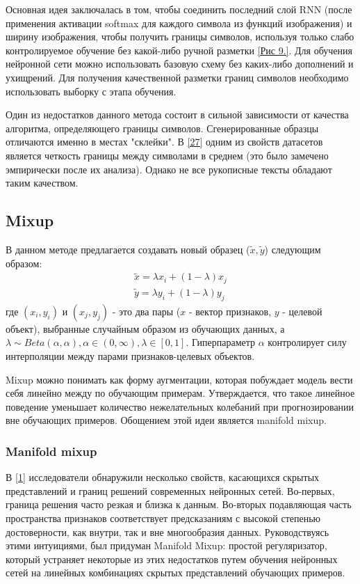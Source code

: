 Основная идея заключалась в том, чтобы соединить последний слой RNN (после применения активации softmax для каждого символа из функций изображения) и ширину изображения, чтобы получить границы символов, используя только слабо контролируемое обучение без какой-либо ручной разметки \hyperlink{image9}{[Рис 9.]}. Для обучения нейронной сети можно использовать базовую схему без каких-либо дополнений и ухищрений. Для получения качественной разметки границ символов необходимо использовать выборку с этапа обучения.

Один из недостатков данного метода состоит в сильной зависимости от качества алгоритма, определяющего границы символов. Сгенерированные образцы отличаются именно в местах "склейки". В \hyperlink{cite.Sho21}{[27]} одним из свойств датасетов является четкость границы между символами в среднем (это было замечено эмпирически после их анализа). Однако не все рукописные тексты обладают таким качеством.

\subsection{Mixup}

В данном методе предлагается создавать новый образец ($\tilde{x}, \tilde{y}$) следующим образом:
\begin{equation}
\begin{split}
\tilde{x} = \lambda x_i + (1 - \lambda) x_j \\
\tilde{y} = \lambda y_i + (1 - \lambda) y_j
\end{split}
\end{equation}
где $(x_i, y_i)$ и $(x_j, y_j)$ - это два пары ($x$ - вектор признаков, $y$ - целевой объект), выбранные случайным образом из обучающих данных, а $\lambda \sim Beta(\alpha, \alpha), \alpha \in (0, \infty), \lambda \in [0, 1]$. Гиперпараметр $\alpha$ контролирует силу интерполяции между парами признаков-целевых объектов.

Mixup можно понимать как форму аугментации, которая побуждает модель вести себя линейно между по обучающим примерам. Утверждается, что такое линейное поведение уменьшает количество нежелательных колебаний при прогнозировании вне обучающих примеров. Обощением этой идеи является manifold mixup.

\subsubsection{Manifold mixup}

В \hyperlink{cite.Ver18}{[1]} исследователи обнаружили несколько свойств, касающихся скрытых представлений и границ решений современных нейронных сетей. Во-первых, граница решения часто резкая и близка к данным. Во-вторых подавляющая часть пространства признаков соответствует предсказаниям с высокой степенью достоверности, как внутри, так и вне многообразия данных. Руководствуясь этими интуициями, был придуман Manifold Mixup: простой регуляризатор, который устраняет некоторые из этих недостатков путем обучения нейронных сетей на линейных комбинациях скрытых представлений обучающих примеров.

